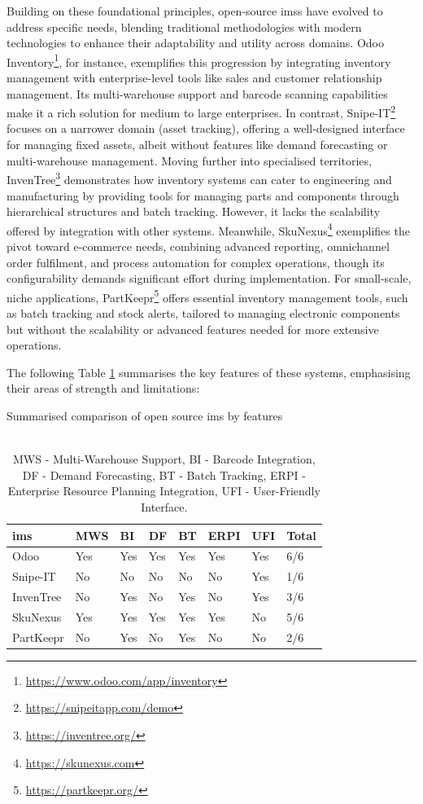 Building on these foundational principles, open-source \acp{ims} have evolved to address specific needs, blending traditional methodologies with modern technologies to enhance their adaptability and utility across domains. Odoo Inventory\footnote{\url{https://www.odoo.com/app/inventory}}, for instance, exemplifies this progression by integrating inventory management with enterprise-level tools like sales and customer relationship management. Its multi-warehouse support and barcode scanning capabilities make it a rich solution for medium to large enterprises. In contrast, Snipe-IT\footnote{\url{https://snipeitapp.com/demo}} focuses on a narrower domain (asset tracking), offering a well-designed interface for managing fixed assets, albeit without features like demand forecasting or multi-warehouse management. Moving further into specialised territories, InvenTree\footnote{\url{https://inventree.org/}} demonstrates how inventory systems can cater to engineering and manufacturing by providing tools for managing parts and components through hierarchical structures and batch tracking. However, it lacks the scalability offered by integration with other systems. Meanwhile, SkuNexus\footnote{\url{https://skunexus.com}} exemplifies the pivot toward e-commerce needs, combining advanced reporting, omnichannel order fulfilment, and process automation for complex operations, though its configurability demands significant effort during implementation. For small-scale, niche applications, PartKeepr\footnote{\url{https://partkeepr.org/}} offers essential inventory management tools, such as batch tracking and stock alerts, tailored to managing electronic components but without the scalability or advanced features needed for more extensive operations.

The following Table \ref{tab:ims_comparison} summarises the key features of these systems, emphasising their areas of strength and limitations:

\begin{table}[!htb]
    \centering
    \caption{Summarised comparison of open source \acl{ims} by features}
    \begin{tabular}{llllllll}
    \toprule
    \textbf{\ac{ims}} & \textbf{MWS} & \textbf{BI} & \textbf{DF} & \textbf{BT} & \textbf{ERPI} & \textbf{UFI} & \textbf{Total} \\
    \midrule
    Odoo & Yes & Yes & Yes & Yes & Yes & Yes & 6/6 \\
    Snipe-IT & No & No & No & No & No & Yes & 1/6 \\
    InvenTree & No & Yes & No & Yes & No & Yes & 3/6 \\
    SkuNexus & Yes & Yes & Yes & Yes & Yes & No & 5/6 \\
    PartKeepr & No & Yes & No & Yes & No & No & 2/6 \\
    \bottomrule
    \end{tabular}
    \caption*{\\MWS - Multi-Warehouse Support, BI - Barcode Integration, DF - Demand Forecasting, BT - Batch Tracking, ERPI - Enterprise Resource Planning Integration, UFI - User-Friendly Interface.}
    \label{tab:ims_comparison}
\end{table}

